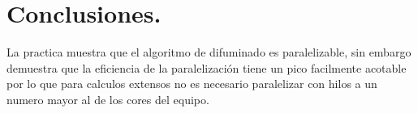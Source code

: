 \documentclass{IEEEtran}
\begin{document}
\section*{Conclusiones.}
La practica muestra que el algoritmo de difuminado es paralelizable, sin embargo
demuestra que la eficiencia de la paralelización tiene un pico facilmente acotable
por lo que para calculos extensos no es necesario paralelizar con hilos a un numero mayor al
de los cores del equipo.




\end{document}
